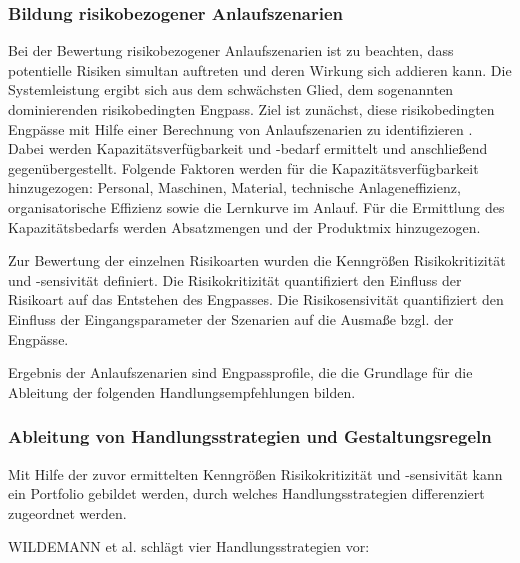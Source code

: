 \subsubsection*{Bildung risikobezogener Anlaufszenarien}\label{sec:wildemannszenarien}
Bei der Bewertung risikobezogener Anlaufszenarien ist zu beachten, dass potentielle Risiken simultan auftreten und deren Wirkung sich addieren kann. Die Systemleistung ergibt sich aus dem schwächsten Glied, dem sogenannten dominierenden risikobedingten Engpass. Ziel ist zunächst, diese risikobedingten Engpässe mit Hilfe einer Berechnung von Anlaufszenarien zu identifizieren \cite{Fleischer2003}. 
Dabei werden Kapazitätsverfügbarkeit und -bedarf ermittelt und anschließend gegenübergestellt. Folgende Faktoren werden für die Kapazitätsverfügbarkeit hinzugezogen: Personal, Maschinen, Material, technische Anlageneffizienz, organisatorische Effizienz sowie die Lernkurve im Anlauf.
Für die Ermittlung des Kapazitätsbedarfs werden Absatzmengen und der Produktmix hinzugezogen. 

Zur Bewertung der einzelnen Risikoarten wurden die Kenngrößen Risikokritizität und -sensivität definiert. 
Die Risikokritizität quantifiziert den Einfluss der Risikoart auf das Entstehen des Engpasses. Die Risikosensivität quantifiziert den Einfluss der Eingangsparameter der Szenarien auf die Ausmaße bzgl. der Engpässe. 

Ergebnis der Anlaufszenarien sind Engpassprofile, die die Grundlage für die Ableitung der folgenden Handlungsempfehlungen bilden. 

\subsubsection*{Ableitung von Handlungsstrategien und Gestaltungsregeln}

Mit Hilfe der zuvor ermittelten Kenngrößen Risikokritizität und -sensivität kann ein Portfolio gebildet werden, durch welches Handlungsstrategien differenziert zugeordnet werden. 

WILDEMANN et al. schlägt vier Handlungsstrategien vor: 


